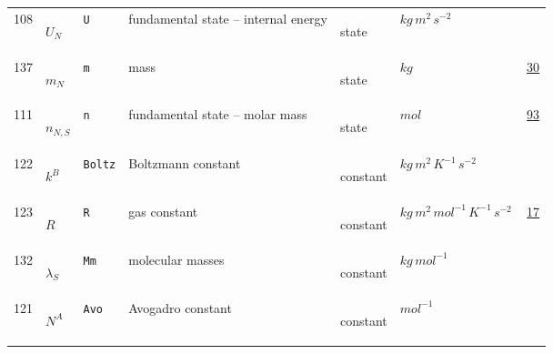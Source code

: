 \begin{longtable}{|p{1cm}|p{2.5cm}|p{4.5cm}|p{8cm}|p{3.0cm}|p{3cm}|p{1cm}|}
            108
             & \hypertarget{"v:108"}{ $ {U}{_{N}} $}
             & \verb|U|
             & fundamental state -- internal energy
             & \begin{lay}state \end{lay}
             & $ kg \,m^{2} \,s^{-2} \, $
             & \\
            137
             & \hypertarget{"v:137"}{ $ {m}{_{N}} $}
             & \verb|m|
             & mass
             & \begin{lay}state \end{lay}
             & $ kg \, $
             &                 \hyperlink{"e:30"}{ 30 }
                 \\
            111
             & \hypertarget{"v:111"}{ $ {n}{_{N, S}} $}
             & \verb|n|
             & fundamental state -- molar mass
             & \begin{lay}state \end{lay}
             & $ mol \, $
             &                 \hyperlink{"e:93"}{ 93 }
                 \\
            122
             & \hypertarget{"v:122"}{ $ {{k^B}}{_{}} $}
             & \verb|Boltz|
             & Boltzmann constant
             & \begin{lay}constant \end{lay}
             & $ kg \,m^{2} \,K^{-1} \,s^{-2} \, $
             & \\
            123
             & \hypertarget{"v:123"}{ $ {R}{_{}} $}
             & \verb|R|
             & gas constant
             & \begin{lay}constant \end{lay}
             & $ kg \,m^{2} \,mol^{-1} \,K^{-1} \,s^{-2} \, $
             &                 \hyperlink{"e:17"}{ 17 }
                 \\
            132
             & \hypertarget{"v:132"}{ $ {{\lambda}}{_{S}} $}
             & \verb|Mm|
             & molecular masses
             & \begin{lay}constant \end{lay}
             & $ kg \,mol^{-1} \, $
             & \\
            121
             & \hypertarget{"v:121"}{ $ {{N^A}}{_{}} $}
             & \verb|Avo|
             & Avogadro constant
             & \begin{lay}constant \end{lay}
             & $ mol^{-1} \, $
             & \\

\end{longtable}
